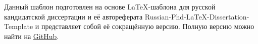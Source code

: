 Данный шаблон подготовлен на основе LaTeX-шаблона для русской кандидатской диссертации и её автореферата Russian-Phd-LaTeX-Dissertation-Template и представляет собой её сокращённую версию.
Полную версию можно найти на
\href{https://github.com/AndreyAkinshin/Russian-Phd-LaTeX-Dissertation-Template}{GitHub}.
\newpage
